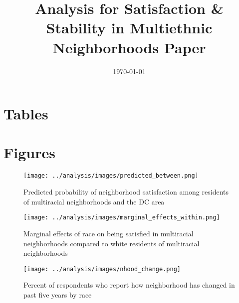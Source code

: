 \documentclass[]{baderart}
\title{Analysis for Satisfaction \& Stability in Multiethnic Neighborhoods Paper}
\date{\today}
\begin{document}
\maketitle

\section{Tables}

















\clearpage
\section{Figures}

\vspace{10em}
\begin{figure}
\begin{minipage}{\textwidth}
\centering
\caption{Predicted probability of neighborhood satisfaction among residents of multiracial neighborhoods and the DC area}
\texttt{[image: ../analysis/images/predicted\_between.png]}
\end{minipage}
\end{figure}
\clearpage

\begin{figure}
\begin{minipage}{\textwidth}
\centering
\caption{Marginal effects of race on being satisfied in multiracial neighborhoods compared to white residents of multiracial neighborhoods}
\label{fig:within}
\texttt{[image: ../analysis/images/marginal\_effects\_within.png]}
\end{minipage}
\end{figure}
\clearpage

\begin{figure}
\begin{minipage}{\textwidth}
\centering
\caption{Percent of respondents who report how neighborhood has changed in past five years by race}
\label{fig:change}
\texttt{[image: ../analysis/images/nhood\_change.png]}
\end{minipage}
\end{figure}
\end{document}
